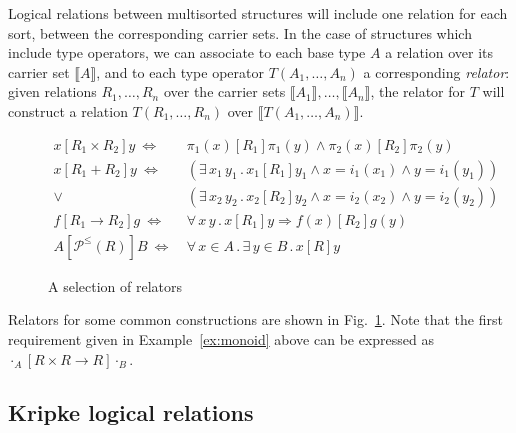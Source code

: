 \documentclass[sigplan,10pt,review,anonymous]{acmart}
\newcommand{\ifr}[1]{\mathrel{[{#1}]}}
\begin{document}
Logical relations between multisorted structures
will include one relation for each sort,
between the corresponding carrier sets.
In the case of structures which include type operators,
we can associate to each base type $A$
a relation over its carrier set $\llbracket A \rrbracket$,
and to each type operator $T(A_1, \ldots, A_n)$
a corresponding \emph{relator}:
given relations $R_1, \ldots, R_n$ over
the carrier sets $\llbracket A_1 \rrbracket, \ldots, \llbracket A_n \rrbracket$,
the relator for $T$
will construct a relation $T(R_1, \ldots, R_n)$
over $\llbracket T(A_1, \ldots, A_n) \rrbracket$.

\begin{figure} %
  {\small
  \begin{align*}
    x \ifr{R_1 \times R_2} y \ \Leftrightarrow\  &
      \pi_1(x) \ifr{R_1} \pi_1(y) \wedge
      \pi_2(x) \ifr{R_2} \pi_2(y) \\
    x \ifr{R_1 + R_2} y \ \Leftrightarrow\  &
      (\exists \, x_1 \, y_1 \,.\,
        x_1 \ifr{R_1} y_1 \wedge
        x = i_1(x_1) \wedge
        y = i_1(y_1)) \\ \vee\ &
      (\exists \, x_2 \, y_2 \,.\,
        x_2 \ifr{R_2} y_2 \wedge
        x = i_2(x_2) \wedge
        y = i_2(y_2)) \\
    f \ifr{R_1 \rightarrow R_2} g \ \Leftrightarrow\  &
      \forall \, x \, y \,.\,
        x \ifr{R_1} y \Rightarrow
        f(x) \ifr{R_2} g(y) \\
    A \ifr{\mathcal{P}^\le(R)} B \ \Leftrightarrow\  &
      \forall \, x \in A \,.\,
      \exists \, y \in B \,.\,
      x \ifr{R} y
  \end{align*}
  }%
  \caption{A selection of relators}
  \label{fig:relators}
\end{figure}

Relators for some common constructions are shown in Fig.~\ref{fig:relators}.
Note that the first requirement given in Example~\ref{ex:monoid} above
can be expressed as
$
  \cdot_A \ifr{R \times R \rightarrow R} \cdot_B
$.



\subsection{Kripke logical relations} %
\label{sec:klr}
\end{document}
